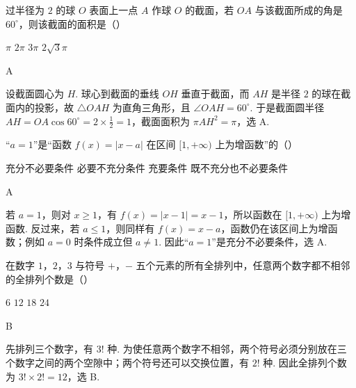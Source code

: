 \begin{problem}
过半径为 \(2\) 的球 \(O\) 表面上一点 \(A\) 作球 \(O\) 的截面，若 \(OA\) 与该截面所成的角是 \(60^{\circ}\)，则该截面的面积是（\quad）

\choices
    {\(\pi\)}
    {\(2\pi\)}
    {\(3\pi\)}
    {\(2\sqrt{3}\pi\)}
\end{problem}

\begin{answer}
A
\end{answer}

\begin{solution}
设截面圆心为 \(H\). 球心到截面的垂线 \(OH\) 垂直于截面，而 \(AH\) 是半径 \(2\) 的球在截面内的投影，故 \(\triangle OAH\) 为直角三角形，且 \(\angle OAH=60^{\circ}\). 于是截面圆半径 \(AH=OA\cos60^{\circ}=2\times\frac12=1\)，截面面积为 \(\pi AH^2=\pi\)，选 A.
\end{solution}

\begin{problem}
“\(a=1\)”是“函数 \(f(x)=|x-a|\) 在区间 \([1,+\infty)\) 上为增函数”的（\quad）

\choices
    {充分不必要条件}
    {必要不充分条件}
    {充要条件}
    {既不充分也不必要条件}
\end{problem}

\begin{answer}
A
\end{answer}

\begin{solution}
若 \(a=1\)，则对 \(x\geqslant1\)，有 \(f(x)=|x-1|=x-1\)，所以函数在 \([1,+\infty)\) 上为增函数. 反过来，若 \(a\leqslant1\)，则同样有 \(f(x)=x-a\)，函数仍在该区间上为增函数；例如 \(a=0\) 时条件成立但 \(a\neq1\). 因此“\(a=1\)”是充分不必要条件，选 A.
\end{solution}

\begin{problem}
在数字 \(1\)，\(2\)，\(3\) 与符号 \(+\)，\(-\) 五个元素的所有全排列中，任意两个数字都不相邻的全排列个数是（\quad）

\choices
    {\(6\)}
    {\(12\)}
    {\(18\)}
    {\(24\)}
\end{problem}

\begin{answer}
B
\end{answer}

\begin{solution}
先排列三个数字，有 \(3!\) 种. 为使任意两个数字不相邻，两个符号必须分别放在三个数字之间的两个空隙中；两个符号还可以交换位置，有 \(2!\) 种. 因此全排列个数为 \(3!\times2!=12\)，选 B.
\end{solution}

